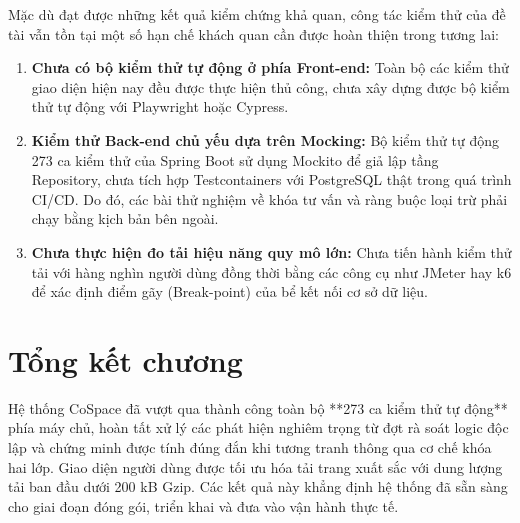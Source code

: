 Mặc dù đạt được những kết quả kiểm chứng khả quan, công tác kiểm thử của đề tài vẫn tồn tại một số hạn chế khách quan cần được hoàn thiện trong tương lai:
\begin{enumerate}
    \item \textbf{Chưa có bộ kiểm thử tự động ở phía Front-end:} Toàn bộ các kiểm thử giao diện hiện nay đều được thực hiện thủ công, chưa xây dựng được bộ kiểm thử tự động với Playwright hoặc Cypress.
    \item \textbf{Kiểm thử Back-end chủ yếu dựa trên Mocking:} Bộ kiểm thử tự động 273 ca kiểm thử của Spring Boot sử dụng Mockito để giả lập tầng Repository, chưa tích hợp Testcontainers với PostgreSQL thật trong quá trình CI/CD. Do đó, các bài thử nghiệm về khóa tư vấn và ràng buộc loại trừ phải chạy bằng kịch bản bên ngoài.
    \item \textbf{Chưa thực hiện đo tải hiệu năng quy mô lớn:} Chưa tiến hành kiểm thử tải với hàng nghìn người dùng đồng thời bằng các công cụ như JMeter hay k6 để xác định điểm gãy (Break-point) của bể kết nối cơ sở dữ liệu.
\end{enumerate}

\section{Tổng kết chương}
\label{sec:kt_tongket}

Hệ thống CoSpace đã vượt qua thành công toàn bộ **273 ca kiểm thử tự động** phía máy chủ, hoàn tất xử lý các phát hiện nghiêm trọng từ đợt rà soát logic độc lập và chứng minh được tính đúng đắn khi tương tranh thông qua cơ chế khóa hai lớp. Giao diện người dùng được tối ưu hóa tải trang xuất sắc với dung lượng tải ban đầu dưới 200 kB Gzip. Các kết quả này khẳng định hệ thống đã sẵn sàng cho giai đoạn đóng gói, triển khai và đưa vào vận hành thực tế.
